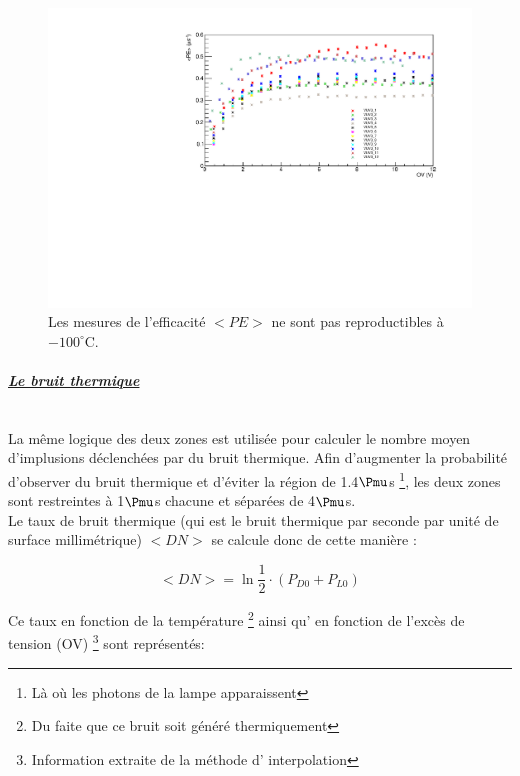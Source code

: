 \documentclass[a4paper, 11pt]{report}%
\begin{document}
  \begin{figure}[!hbtp]
  \centering
  \includegraphics[totalheight=0.35\textwidth,trim=0.5cm 0cm 1.8cm 0.5cm, clip=true]{../Pictures/VUV3_paul.pdf}
  \caption{Les mesures de l'efficacit\'e $<PE>$ ne sont pas reproductibles \`a $-100^\circ$C.}
  \label{fig:issue}
  \end{figure}
  
\paragraph{\textit{\underline{Le bruit thermique}}}
  \leavevmode
  \\
  
  La m\^eme logique des deux zones est utilis\'ee pour calculer le nombre moyen d'implusions d\'eclench\'ees par du bruit thermique. Afin 
  d'augmenter la probabilit\'e d'observer du bruit thermique et d'\'eviter la r\'egion de 1.4$\Pmu$s \footnote{L\`a o\`u les photons de la lampe 
  apparaissent}, les deux zones sont restreintes \`a 1$\Pmu$s chacune et s\'epar\'ees de 4$\Pmu$s.\\
  Le taux de bruit thermique (qui est le bruit thermique par seconde par unit\'e de surface millim\'etrique) $<DN>$ se calcule donc de cette mani\`ere :
  
  \begin{equation}
    <DN> = \ln{\frac{1}{2}\cdot(P_{D0}+P_{L0})}
  \end{equation}
  
  Ce taux en fonction de la temp\'erature \footnote{Du faite que ce bruit soit g\'en\'er\'e thermiquement} ainsi qu' en fonction de 
  l'exc\`es de tension (OV) \footnote{Information extraite de la m\'ethode d' interpolation} sont repr\'esent\'es:  
 
\end{document}
